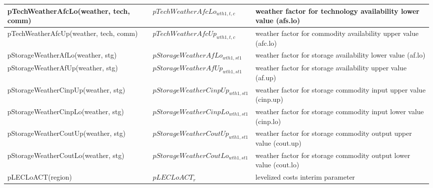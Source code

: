 \documentclass{article}
\begin{document}
\begin{longtable}{|p{10cm}|p{5cm}|p{9cm}|}
 \hline
pTechWeatherAfcLo(weather, tech, comm) & $pTechWeatherAfcLo_{wth1,t,c}$ & weather factor for technology availability lower value (afs.lo) \\ 
 \hline
pTechWeatherAfcUp(weather, tech, comm) & $pTechWeatherAfcUp_{wth1,t,c}$ & weather factor for commodity availability upper value (afc.lo) \\ 
 \hline
pStorageWeatherAfLo(weather, stg) & $pStorageWeatherAfLo_{wth1,st1}$ & weather factor for storage availability lower value (af.lo) \\ 
 \hline
pStorageWeatherAfUp(weather, stg) & $pStorageWeatherAfUp_{wth1,st1}$ & weather factor for storage availability upper value (af.up) \\ 
 \hline
pStorageWeatherCinpUp(weather, stg) & $pStorageWeatherCinpUp_{wth1,st1}$ & weather factor for storage commodity input upper value (cinp.up) \\ 
 \hline
pStorageWeatherCinpLo(weather, stg) & $pStorageWeatherCinpLo_{wth1,st1}$ & weather factor for storage commodity input lower value (cinp.lo) \\ 
 \hline
pStorageWeatherCoutUp(weather, stg) & $pStorageWeatherCoutUp_{wth1,st1}$ & weather factor for storage commodity output upper value (cout.up) \\ 
 \hline
pStorageWeatherCoutLo(weather, stg) & $pStorageWeatherCoutLo_{wth1,st1}$ & weather factor for storage commodity output lower value (cout.lo) \\ 
 \hline
pLECLoACT(region) & $pLECLoACT_{r}$ & levelized costs interim parameter \\ 
 \hline
\end{longtable}
\end{document}
